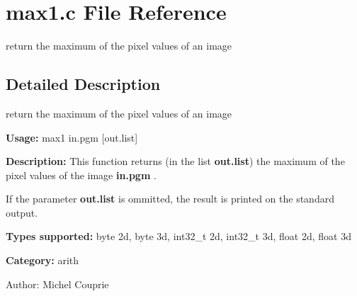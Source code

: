 \section{max1.c File Reference}
\label{max1_8c}
return the maximum of the pixel values of an image  




\label{_details}
\subsection{Detailed Description}
return the maximum of the pixel values of an image 

{\bf Usage:} max1 in.pgm [out.list]

{\bf Description:} This function returns (in the list {\bf out.list}) the maximum of the pixel values of the image {\bf in.pgm} .

If the parameter {\bf out.list} is ommitted, the result is printed on the standard output.

{\bf Types supported:} byte 2d, byte 3d, int32\_\-t 2d, int32\_\-t 3d, float 2d, float 3d

{\bf Category:} arith

\begin{Desc}
\item[Author:]Michel Couprie \end{Desc}
